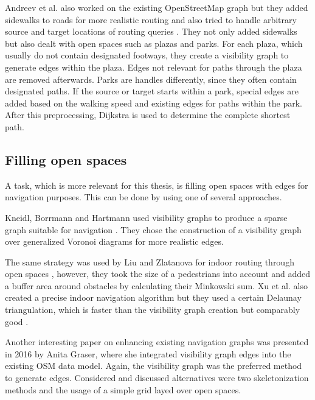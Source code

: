 		Andreev et al. also worked on the existing OpenStreetMap graph but they added sidewalks to roads for more realistic routing and also tried to handle arbitrary source and target locations of routing queries \cite{andreev-osm-generate-sidewalks}.
		They not only added sidewalks but also dealt with open spaces such as plazas and parks.
		For each plaza, which usually do not contain designated footways, they create a visibility graph to generate edges within the plaza.
		Edges not relevant for paths through the plaza are removed afterwards.
		Parks are handles differently, since they often contain designated paths.
		If the source or target starts within a park, special edges are added based on the walking speed and existing edges for paths within the park.
		After this preprocessing, Dijkstra is used to determine the complete shortest path.
	
	\subsection{Filling open spaces}
	\label{subsec:filling-open-spaces}
	
		A task, which is more relevant for this thesis, is filling open spaces with edges for navigation purposes.
		This can be done by using one of several approaches.
	
		Kneidl, Borrmann and Hartmann used visibility graphs to produce a sparse graph suitable for navigation \cite[5]{kneidl-borrmann-hartmann-navigation}.
		They chose the construction of a visibility graph over generalized Voronoi diagrams for more realistic edges.
		
		The same strategy was used by Liu and Zlatanova for indoor routing through open spaces \cite{liu-indoor-routing}, however, they took the size of a pedestrians into account and added a buffer area around obstacles by calculating their Minkowski sum.
		Xu et al. also created a precise indoor navigation algorithm but they used a certain Delaunay triangulation, which is faster than the visibility graph creation but comparably good \cite{xu-indoor-delaunay}.
		
		Another interesting paper on enhancing existing navigation graphs was presented in 2016 by Anita Graser, where she integrated visibility graph edges into the existing OSM data model\cite{graser-osm-open-spaces}.
		Again, the visibility graph was the preferred method to generate edges.
		Considered and discussed alternatives were two skeletonization methods and the usage of a simple grid layed over open spaces.
		
